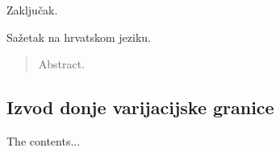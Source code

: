 \documentclass[utf8, diplomski, lmodern]{fer}
\begin{document}
Zaključak.




\begin{sazetak}
Sažetak na hrvatskom jeziku.

\end{sazetak}

\begin{abstract}
Abstract.

\end{abstract}

\begin{appendices}
	\chapter{Izvod donje varijacijske granice}
	The contents...
\end{appendices}
\end{document}
